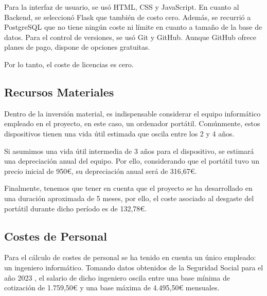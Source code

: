 Para la interfaz de usuario, se usó HTML, CSS y JavaScript. En cuanto al Backend, se seleccionó Flask que también de costo cero. Además, se recurrió a PostgreSQL que no tiene ningún coste ni límite en cuanto a tamaño de la base de datos. Para el control de versiones, se usó Git y GitHub. Aunque GitHub ofrece planes de pago, dispone de opciones gratuitas. 

Por lo tanto, el coste de licencias es cero. 

\subsection{Recursos Materiales}

Dentro de la inversión material, es indispensable considerar el equipo informático empleado en el proyecto, en este caso, un ordenador portátil. Comúnmente, estos dispositivos tienen una vida útil estimada que oscila entre los 2 y 4 años. 

Si asumimos una vida útil intermedia de 3 años para el dispositivo, se estimará una depreciación anual del equipo. Por ello, considerando que el portátil tuvo un precio inicial de 950€, su depreciación anual será de 316,67€. 

Finalmente, tenemos que tener en cuenta que el proyecto se ha desarrollado en una duración aproximada de 5 meses, por ello, el coste asociado al desgaste del portátil durante dicho período es de 132,78€.

\subsection{Costes de Personal}

Para el cálculo de costes de personal se ha tenido en cuenta un único empleado: un ingeniero informático. Tomando datos obtenidos de la Seguridad Social para el año 2023 \cite{seg-social}, el salario de dicho ingeniero oscila entre una base mínima de cotización de 1.759,50€ y una base máxima de 4.495,50€ mensuales.

